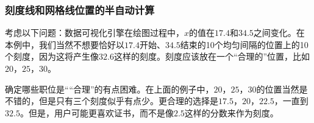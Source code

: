 \subsubsection{刻度线和网格线位置的半自动计算}
\label{section-dv-concept-tick-placement-strategies}


考虑以下问题：数据可视化引擎在绘图过程中，$x$的值在$17.4$和$34.5$之间变化。在本例中，我们当然不想要恰好以$17.4$开始、$34.5$结束的10个均匀间隔的位置上的10个刻度，因为这将产生像$32.6$这样的刻度。刻度应该放在一个``合理的''位置，比如$20$，$25$，$30$。


确定哪些职位是“``合理''的有点困难。在上面的例子中，$20$，$25$，$30$的位置当然是不错的，但是只有三个刻度似乎有点少。更合理的选择是$17.5$，$20$，$22.5$，一直到$32.5$。但是，用户可能更喜欢证书，而不是像$2.5$这样的分数来作为刻度。


